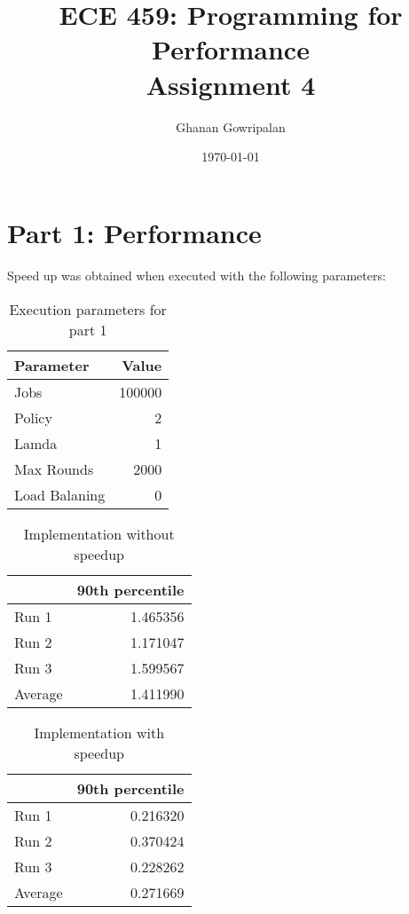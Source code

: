 \documentclass[12pt]{article}
\title{ECE 459: Programming for Performance\\Assignment 4}
\author{Ghanan Gowripalan}
\date{\today}
\begin{document}
\maketitle

\section*{Part 1: Performance}

\paragraph{} Speed up was obtained when executed with the following parameters:
\begin{table}[H]
  \centering
  \begin{tabular}{lr}
    {\bf Parameter} & {\bf Value} \\
    \hline
    Jobs & 100000 \\
    Policy & 2 \\
    Lamda & 1 \\
    Max Rounds & 2000 \\
    Load Balaning & 0 \\
  \end{tabular}
  \caption{Execution parameters for part 1}
  \label{tbl-part1-params}
\end{table}

\begin{table}[H]
  \centering
  \begin{tabular}{lr}
    & {\bf 90th percentile} \\
    \hline
    Run 1 & 1.465356 \\
    Run 2 & 1.171047 \\
    Run 3 & 1.599567 \\
    \hline
    Average & 1.411990 \\
  \end{tabular}
  \caption{Implementation without speedup}
  \label{tbl-part1-originall}
\end{table}

\begin{table}[H]
  \centering
  \begin{tabular}{lr}
    & {\bf 90th percentile} \\
    \hline
    Run 1 & 0.216320 \\
    Run 2 & 0.370424 \\
    Run 3 & 0.228262 \\
    \hline
    Average & 0.271669 \\
  \end{tabular}
  \caption{Implementation with speedup}
  \label{tbl-part1-speedup}
\end{table}
\end{document}
